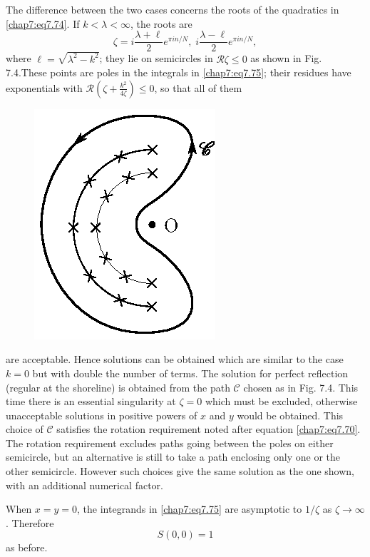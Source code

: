 {{The difference between the two cases concerns the roots of the quadratics in \eqref{chap7:eq7.74}. If $k<\lambda <\infty$, the roots are 
\begin{equation}
\zeta=i\frac{\lambda+\ell}{2}e^{\pi in/N},\;i\frac{\lambda-\ell}{2} e^{\pi in/N}, \tag{7.76}\label{chap7:eq7.76}
\end{equation}
where $\ell=\sqrt{\lambda^2-k^2}$; they lie on semicircles in $\mathscr{R}\zeta \leq 0$ as shown in Fig. 7.4.\pageoriginale These points are poles in the integrals in \eqref{chap7:eq7.75}; their residues have exponentials with $\mathscr{R}(\zeta+\frac{k^2}{4\zeta})\leq 0$, so that all of them
\begin{figure}[H]
\centering
\includegraphics{figures/fig61-7.4.eps}
\caption{}
\label{chap1:fig7.4}
\end{figure}
\noindent
are acceptable. Hence solutions can be obtained which are similar to the case $k=0$ but with double the number of terms. The solution for perfect reflection (regular at the shoreline) is obtained from the path $\mathscr{C}$ chosen as in Fig. 7.4. This time there is an essential singularity at $\zeta =0$ which must be excluded, otherwise unacceptable solutions in positive powers of $x$ and $y$ would be obtained. This choice of $\mathscr{C}$ satisfies the rotation requirement noted after equation \eqref{chap7:eq7.70}. The rotation requirement excludes paths going between the poles on either semicircle, but an alternative is still to take a path enclosing only one or the other semicircle. However such choices give the same solution as the one shown, with an additional numerical factor.

When $x=y=0$, the integrands in \eqref{chap7:eq7.75} are asymptotic to $1/\zeta$ as $\zeta\to\infty$. Therefore
$$
S(0,0)=1
$$\pageoriginale
as before.

}}
